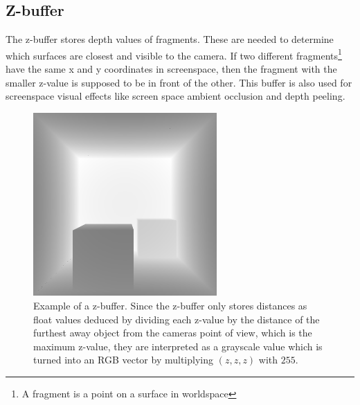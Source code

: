 \documentclass{ACGSeminar}
\begin{document}
	\subsection{Z-buffer}
		The z-buffer stores depth values of fragments. These are needed to determine which surfaces are closest and visible to the camera. If two different fragments\footnote{A fragment is a point on a surface in worldspace\footnotemark} have the same x and y coordinates in screenspace\footnotemark, then the fragment with the smaller z-value is supposed to be in front of the other. This buffer is also used for screenspace visual effects like screen space ambient occlusion and depth peeling. 
		\addtocounter{footnote}{-1}
		\begin{figure}[htb!]%
			\begin{center}%
				\includegraphics[width=7cm]{img/z_buffer.png}
			\end{center}%
			\caption{Example of a z-buffer. Since the z-buffer only stores distances as float values deduced by dividing each
			z-value by the distance of the furthest away object from the cameras point of view, which is the maximum z-value, they are interpreted as a grayscale value which is turned into an RGB vector by multiplying $(z, z, z)$ with $255$.}%
			\label{fig:z_buffer}
		\end{figure}%
\end{document}
